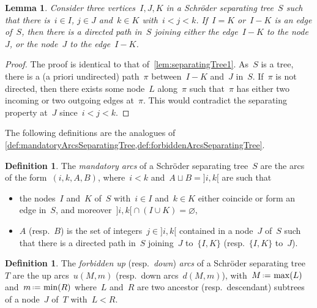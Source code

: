 \documentclass{amsart}
\newtheorem{lemma}[theorem]{Lemma}
\theoremstyle{definition}
\newtheorem{definition}[theorem]{Definition}
\newcommand{\eqdef}{\mbox{\,\raisebox{0.2ex}{\scriptsize\ensuremath{\mathrm:}}\ensuremath{=}\,}} %
\newcommand{\darkblue}{\color{darkblue}} %
\newcommand{\defn}[1]{\textsl{\darkblue #1}} %
\begin{document}
\begin{lemma}
\label{lem:SchroderSeparatingTree1}
Consider three vertices~$I,J,K$ in a Schröder separating tree~$S$ such that there is~$i \in I$, $j \in J$ and~$k \in K$ with~$i < j < k$.
If~$I = K$ or~$I - K$ is an edge of~$S$, then there is a directed path in~$S$ joining either the edge~$I-K$ to the node~$J$, or the node~$J$ to the edge~$I-K$.
\end{lemma}

\begin{proof}
The proof is identical to that of~\cref{lem:separatingTree1}.
As~$S$ is a tree, there is a (a priori undirected) path~$\pi$ between~$I-K$ and~$J$ in~$S$.
If~$\pi$ is not directed, then there exists some node~$L$ along~$\pi$ such that~$\pi$ has either two incoming or two outgoing edges at~$\pi$.
This would contradict the separating property at~$J$ since~$i < j < k$.
\end{proof}

The following  definitions are the analogues of \cref{def:mandatoryArcsSeparatingTree,def:forbiddenArcsSeparatingTree}.

\begin{definition}
\label{def:mandatoryArcsSchroderSeparatingTree}
The \defn{mandatory arcs} of a Schröder separating tree~$S$ are the arcs of the form~$(i, k, A, B)$, where~$i < k$ and~$A \sqcup B = {]i,k[}$ are such that
\begin{itemize}
\item the nodes~$I$ and~$K$ of~$S$ with~$i \in I$ and~$k \in K$ either coincide or form an edge in~$S$, and moreover~${]i,k[} \cap (I \cup K) = \varnothing$, 
\item $A$ (resp.~$B$) is the set of integers~$j \in {]i,k[}$ contained in a node~$J$ of~$S$ such that there is a directed path in~$S$ joining~$J$ to~$\{I,K\}$ (resp.~$\{I,K\}$ to~$J$).
\end{itemize}
\end{definition}

\begin{definition}
\label{def:forbiddenArcsSchroderSeparatingTree}
The \defn{forbidden up} (resp.~\defn{down}) \defn{arcs} of a Schröder separating tree~$T$ are the up arcs~$u(M, m)$ (resp.~down arcs~$d(M, m)$), with~$M \eqdef \max(L)$ and~$m \eqdef \min(R)$ where~$L$ and~$R$ are two ancestor (resp.~descendant) subtrees of a node~$J$ of~$T$ with~$L < R$.
\end{definition}
\end{document}
